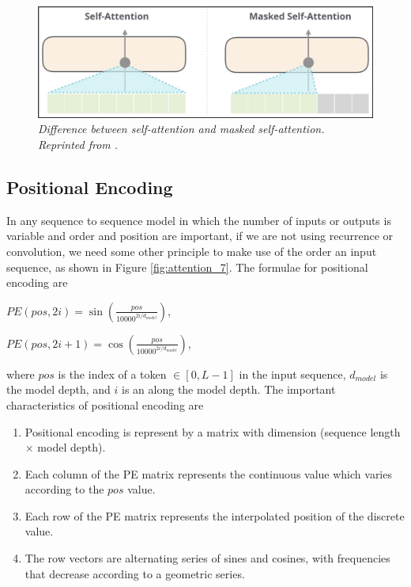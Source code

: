 \begin{figure}[H]
  \centering
  \caption[Difference between self-attention and masked self-attention.]{\emph{Difference between self-attention and masked self-attention. \\ Reprinted from \citeauthor{alammar_2019} \citeyear{alammar_2019}.}}\label{fig:attention_6}
  \includegraphics[scale = 0.3]{figures/attention_6.jpg}
\end{figure}
\subsection{Positional Encoding}


In any sequence to sequence model in which the number of inputs or outputs is variable and order and position are important, if we are not using recurrence or convolution, we need some other principle to make use of the order an input sequence, as shown in Figure \ref{fig:attention_7}. The formulae for positional encoding are

\hfil $PE(pos, 2i) = \sin(\frac{pos}{10000^{2i/d_{model}}})$, \par
\hfil $PE(pos, 2i + 1) = \cos(\frac{pos}{10000^{2i/d_{model}}})$, \par

where $pos$ is the index of a token $\in[0, L-1]$ in the input sequence, $d_{model}$ is the model depth, and $i$ is an along the model depth. The important characteristics of positional encoding are

\begin{enumerate}
  \item Positional encoding is represent by a matrix with dimension (sequence length $\times$ model depth).
  \item Each column of the PE matrix represents the continuous value which varies according to the $pos$ value.
  \item Each row of the PE matrix represents the interpolated position of the discrete value.
  \item The row vectors are alternating series of sines and cosines, with frequencies that decrease according to a geometric series.
\end{enumerate}

